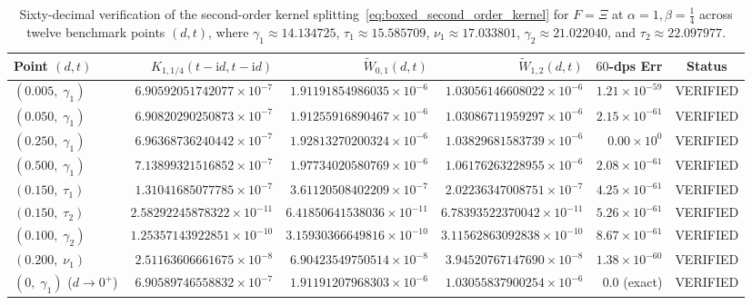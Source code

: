 \documentclass[11pt,reqno]{amsart}
\theoremstyle{definition}
\theoremstyle{remark}
\numberwithin{equation}{section}
\newcommand{\ii}{\mathrm{i}}
\begin{document}
\begin{table}[t]
\centering
\caption{Sixty-decimal verification of the second-order kernel splitting~\eqref{eq:boxed_second_order_kernel} for $F = \Xi$ at $\alpha = 1, \beta = \frac{1}{4}$ across twelve benchmark points $(d,t)$, where $\gamma_1 \approx 14.134725$, $\tau_1 \approx 15.585709$, $\nu_1 \approx 17.033801$, $\gamma_2 \approx 21.022040$, and $\tau_2 \approx 22.097977$.}\label{tab:second_order_kernel}
\scriptsize
\setlength{\tabcolsep}{2.2pt}
\begin{tabular}{@{}lrrrrc@{}}
\toprule
Point $(d, t)$ & $K_{1,1/4}(t-\ii d, t-\ii d)$ & $\widetilde{W}_{0,1}(d,t)$ & $\widetilde{W}_{1,2}(d,t)$ & $60$-dps Err & Status \\
\midrule
$(0.005,\; \gamma_1)$ & $6.90592051742077\times 10^{-7}$  & $1.91191854986035\times 10^{-6}$  & $1.03056146608022\times 10^{-6}$  & $1.21\times 10^{-59}$ & VERIFIED \\
$(0.050,\; \gamma_1)$ & $6.90820290250873\times 10^{-7}$  & $1.91255916890467\times 10^{-6}$  & $1.03086711959297\times 10^{-6}$  & $2.15\times 10^{-61}$ & VERIFIED \\
$(0.250,\; \gamma_1)$ & $6.96368736240442\times 10^{-7}$  & $1.92813270200324\times 10^{-6}$  & $1.03829681583739\times 10^{-6}$  & $0.00\times 10^{0}$   & VERIFIED \\
$(0.500,\; \gamma_1)$ & $7.13899321516852\times 10^{-7}$  & $1.97734020580769\times 10^{-6}$  & $1.06176263228955\times 10^{-6}$  & $2.08\times 10^{-61}$ & VERIFIED \\
$(0.150,\; \tau_1)$   & $1.31041685077785\times 10^{-7}$  & $3.61120508402209\times 10^{-7}$  & $2.02236347008751\times 10^{-7}$  & $4.25\times 10^{-61}$ & VERIFIED \\
$(0.150,\; \tau_2)$   & $2.58292245878322\times 10^{-11}$ & $6.41850641538036\times 10^{-11}$ & $6.78393522370042\times 10^{-11}$ & $5.26\times 10^{-61}$ & VERIFIED \\
$(0.100,\; \gamma_2)$ & $1.25357143922851\times 10^{-10}$ & $3.15930366649816\times 10^{-10}$ & $3.11562863092838\times 10^{-10}$ & $8.67\times 10^{-61}$ & VERIFIED \\
$(0.200,\; \nu_1)$    & $2.51163606661675\times 10^{-8}$  & $6.90423549750514\times 10^{-8}$  & $3.94520767147690\times 10^{-8}$  & $1.38\times 10^{-60}$ & VERIFIED \\
$(0,\; \gamma_1)$ ($d\to 0^+$) & $6.90589746558832\times 10^{-7}$  & $1.91191207968303\times 10^{-6}$  & $1.03055837900254\times 10^{-6}$  & $0.0$ (exact) & VERIFIED \\

\end{tabular}
\end{table}
\end{document}
